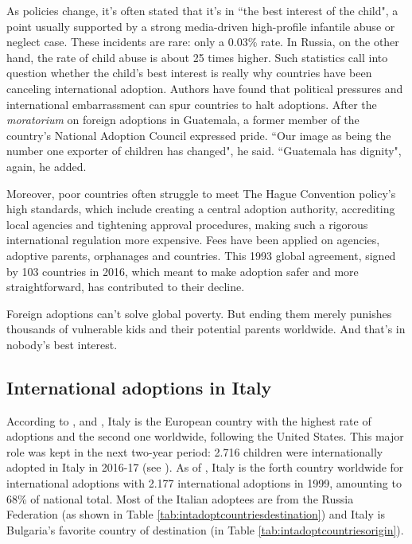 As policies change, it's often stated that it's in ``the best interest of the child", a point usually supported by a strong media-driven high-profile infantile abuse or neglect case. These incidents are rare: only a 0.03\% rate. In Russia, on the other hand, the rate of child abuse is about 25 times higher. Such statistics call into question whether the child's best interest is really why countries have been canceling international adoption. Authors have found that political pressures and international embarrassment  can spur countries to halt adoptions. After the \textit{moratorium} on foreign adoptions in Guatemala, a former member of the country's National Adoption Council expressed pride. ``Our image as being the number one exporter of children has changed", he said. ``Guatemala has dignity", again, he added.

Moreover, poor countries often struggle to meet The Hague Convention policy's high standards, which include creating a central adoption authority, accrediting local agencies and tightening approval procedures, making such a rigorous international regulation more expensive. Fees have been applied on agencies, adoptive parents, orphanages and countries. This 1993 global agreement, signed by 103 countries in 2016, which meant to make adoption safer and more straightforward, has contributed to their decline.

Foreign adoptions can't solve global poverty. But ending them merely punishes thousands of vulnerable kids and their potential parents worldwide. And that's in nobody's best interest.

\subsection{International adoptions in Italy}\label{sub:intadoptionsinitaly}
According to \cite{notonlyinfectious}, \cite{nonsoloinfezioni} and \cite{cai2014}, Italy is the European country with the highest rate of adoptions and the second one worldwide, following the United States. This major role was kept in the next two-year period: 2.716 children were internationally adopted in Italy in 2016-17 (see \cite{cai2016}).
As of \cite{unreport}, Italy is the forth country worldwide for international adoptions with 2.177 international adoptions in 1999, amounting to 68\% of national total. Most of the Italian adoptees are from the Russia Federation (as shown in Table \ref{tab:intadoptcountriesdestination}) and Italy is Bulgaria's favorite country of destination (in Table \ref{tab:intadoptcountriesorigin}).



